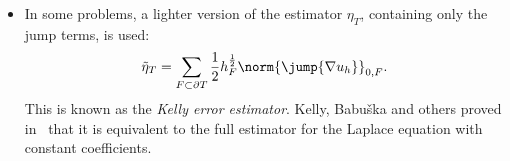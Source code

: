 \begin{itemize}
    \item In some problems, a lighter version of the estimator $\eta_T$, containing only the jump terms, is used:
    \[
        \tilde{\eta}_T = \sum_{F \subset \partial T} \frac{1}{2} h_F^{\frac{1}{2}} \norm{\jump{\nabla u_h}}_{0,F}.
    \]
    This is known as the \emph{Kelly error estimator}. Kelly, Babu\v{s}ka and others proved in~\cite{kelly83} that it is equivalent to the full estimator for the Laplace equation with constant coefficients.
\end{itemize}

